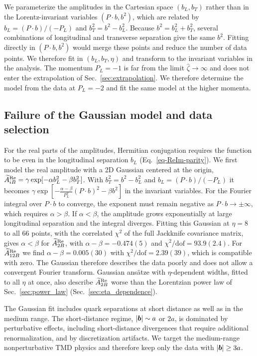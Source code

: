 We parameterize the amplitudes in the Cartesian space $(b_L,b_T)$ rather than in the Lorentz-invariant variables $(P\cdot b,b^2)$, which are related by $b_L=(P\cdot b)/(-P_L)$ and $b_T^2=b^2-b_L^2$. Because $b^2=b_L^2+b_T^2$, several combinations of longitudinal and transverse separation give the same $b^2$. Fitting directly in $(P\cdot b,b^2)$ would merge these points and reduce the number of data points. We therefore fit in $(b_L,b_T,\eta)$ and transform to the invariant variables in the analysis. The momentum $P_L=-1$ is far from the limit $\hat\zeta\to\infty$ and does not enter the extrapolation of Sec.~\ref{sec:extrapolation}. We therefore determine the model from the data at $P_L=-2$ and fit the same model at the higher momenta.

\subsection{Failure of the Gaussian model and data selection}
\label{sec:fit_strategy}

For the real parts of the amplitudes, Hermitian conjugation requires the function to be even in the longitudinal separation $b_L$ (Eq.~\eqref{eq-ReIm-parity}). We first model the real amplitude with a 2D Gaussian centered at the origin, $\widetilde{A}^{\text{Re}}_{iB}=\gamma\exp[-\alpha b_L^2-\beta b_T^2]$. With $b_T^2=b^2-b_L^2$ and $b_L=(P\cdot b)/(-P_L)$ it becomes $\gamma\exp[-\tfrac{\alpha-\beta}{P_L^2}(P\cdot b)^2-\beta b^2]$ in the invariant variables. For the Fourier integral over $P\cdot b$ to converge, the exponent must remain negative as $P\cdot b\to\pm\infty$, which requires $\alpha>\beta$. If $\alpha<\beta$, the amplitude grows exponentially at large longitudinal separation and the integral diverges. Fitting this Gaussian at $\eta=8$ to all $66$ points, with the correlated $\chi^2$ of the full Jackknife covariance matrix, gives $\alpha<\beta$ for $\widetilde{A}^{\text{Re}}_{2B}$, with $\alpha-\beta=-0.474(5)$ and $\chi^2/\text{dof}=93.9(2.4)$. For $\widetilde{A}^{\text{Re}}_{12B}$ we find $\alpha-\beta=0.005(30)$ with $\chi^2/\text{dof}=2.39(39)$, which is compatible with zero. The Gaussian therefore describes the data poorly and does not allow a convergent Fourier transform. Gaussian ansätze with $\eta$-dependent widths, fitted to all $\eta$ at once, also describe $\widetilde{A}^{\text{Re}}_{2B}$ worse than the Lorentzian power law of Sec.~\ref{sec:power_law} (Sec.~\ref{sec:eta_dependence}).


The Gaussian fit includes quark separations at short distance as well as in the medium range. The short-distance regime, $|\boldsymbol{b}|\sim a$ or $2a$, is dominated by perturbative effects, including short-distance divergences that require additional renormalization, and by discretization artifacts. We target the medium-range nonperturbative TMD physics and therefore keep only the data with $|\boldsymbol{b}|\ge 3a$.

